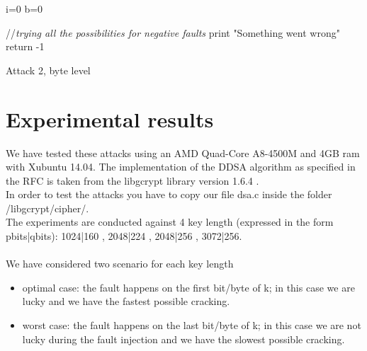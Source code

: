 \documentclass[11pt,english]{article}
\begin{document}
\begin{itemize}
\begin{algorithm}[H]
  i=0\;  
  b=0\;
  
  //\textit{trying all the possibilities for negative faults}\;
  print "Something went wrong"\;
  return -1

  \caption{Attack 2, byte level}
\end{algorithm}



\end{itemize}
\section{Experimental results}
We have tested these attacks using an AMD Quad-Core A8-4500M and 4GB ram with Xubuntu 14.04. 
The implementation of the DDSA algorithm as specified in the RFC\cite{rfc} is taken from the libgcrypt library version 1.6.4 \cite{lib}.\\
In order to test the attacks you have to copy our file dsa.c inside the folder /libgcrypt/cipher/.
\\The experiments are conducted against 4 key length (expressed in the form pbits|qbits): 1024|160 , 2048|224 , 2048|256 , 3072|256.\\\\
We have considered two scenario for each key length
\begin{itemize}
\item optimal case: the fault happens on the first bit/byte of k; in this case we are lucky and we have the fastest possible cracking.
\item worst case: the fault happens on the last bit/byte of k; in this case we are not lucky during the fault injection and we have the slowest possible cracking.
\end{itemize}
\end{document}
